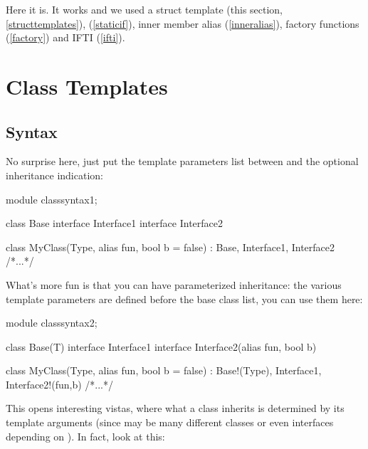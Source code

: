 Here it is. It works and we used a struct template (this section, \ref{structtemplates}),  (\ref{staticif}), inner member alias (\ref{inneralias}), factory functions (\ref{factory}) and IFTI (\ref{ifti}).

\section{Class Templates}\label{classtemplates}


\subsection{Syntax}\label{classsyntax}

No surprise here, just put the template parameters list between  and the optional inheritance indication:

\begin{dcode}
module classsyntax1;

class Base {}
interface Interface1 {}
interface Interface2 {}

class MyClass(Type, alias fun, bool b = false)
    : Base, Interface1, Interface2
{ /*...*/ }
\end{dcode}

What's more fun is that you can have parameterized inheritance: the various template parameters are defined before the base class list, you can use them here:

\begin{dcode}
module classsyntax2;

class Base(T) {}
interface Interface1 {}
interface Interface2(alias fun, bool b) {}

class MyClass(Type, alias fun, bool b = false)
    : Base!(Type), Interface1, Interface2!(fun,b)
{ /*...*/ }
\end{dcode}


This opens interesting vistas, where what a class inherits is determined by its template arguments (since  may be many different classes or even interfaces depending on ). In fact, look at this:

